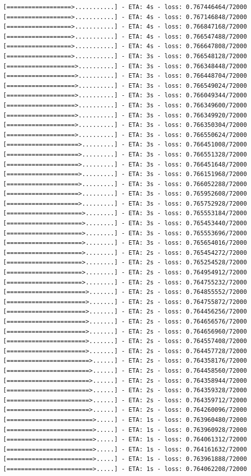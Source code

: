 \documentclass[12pt,fleqn]{article}\usepackage{../../common}
\begin{document}
\begin{verbatim}
[==================>...........] - ETA: 4s - loss: 0.767446464/72000 [==================>...........] - ETA: 4s - loss: 0.767146848/72000 [==================>...........] - ETA: 4s - loss: 0.766847168/72000 [==================>...........] - ETA: 4s - loss: 0.766547488/72000 [==================>...........] - ETA: 4s - loss: 0.766647808/72000 [==================>...........] - ETA: 3s - loss: 0.766548128/72000 [===================>..........] - ETA: 3s - loss: 0.766348448/72000 [===================>..........] - ETA: 3s - loss: 0.766448704/72000 [===================>..........] - ETA: 3s - loss: 0.766549024/72000 [===================>..........] - ETA: 3s - loss: 0.766049344/72000 [===================>..........] - ETA: 3s - loss: 0.766349600/72000 [===================>..........] - ETA: 3s - loss: 0.766349920/72000 [===================>..........] - ETA: 3s - loss: 0.766350304/72000 [===================>..........] - ETA: 3s - loss: 0.766550624/72000 [====================>.........] - ETA: 3s - loss: 0.766451008/72000 [====================>.........] - ETA: 3s - loss: 0.766551328/72000 [====================>.........] - ETA: 3s - loss: 0.766451648/72000 [====================>.........] - ETA: 3s - loss: 0.766151968/72000 [====================>.........] - ETA: 3s - loss: 0.766052288/72000 [====================>.........] - ETA: 3s - loss: 0.765952608/72000 [====================>.........] - ETA: 3s - loss: 0.765752928/72000 [=====================>........] - ETA: 3s - loss: 0.765553184/72000 [=====================>........] - ETA: 3s - loss: 0.765453440/72000 [=====================>........] - ETA: 3s - loss: 0.765553696/72000 [=====================>........] - ETA: 3s - loss: 0.765654016/72000 [=====================>........] - ETA: 2s - loss: 0.765454272/72000 [=====================>........] - ETA: 2s - loss: 0.765254528/72000 [=====================>........] - ETA: 2s - loss: 0.764954912/72000 [=====================>........] - ETA: 2s - loss: 0.764755232/72000 [======================>.......] - ETA: 2s - loss: 0.764855552/72000 [======================>.......] - ETA: 2s - loss: 0.764755872/72000 [======================>.......] - ETA: 2s - loss: 0.764456256/72000 [======================>.......] - ETA: 2s - loss: 0.764656576/72000 [======================>.......] - ETA: 2s - loss: 0.764656960/72000 [======================>.......] - ETA: 2s - loss: 0.764557408/72000 [======================>.......] - ETA: 2s - loss: 0.764457728/72000 [=======================>......] - ETA: 2s - loss: 0.764358176/72000 [=======================>......] - ETA: 2s - loss: 0.764458560/72000 [=======================>......] - ETA: 2s - loss: 0.764358944/72000 [=======================>......] - ETA: 2s - loss: 0.764359328/72000 [=======================>......] - ETA: 2s - loss: 0.764359712/72000 [=======================>......] - ETA: 2s - loss: 0.764260096/72000 [========================>.....] - ETA: 1s - loss: 0.763960480/72000 [========================>.....] - ETA: 1s - loss: 0.763960928/72000 [========================>.....] - ETA: 1s - loss: 0.764061312/72000 [========================>.....] - ETA: 1s - loss: 0.764161632/72000 [========================>.....] - ETA: 1s - loss: 0.763961888/72000 [========================>.....] - ETA: 1s - loss: 0.764062208/72000 
\end{verbatim}
\end{document}
